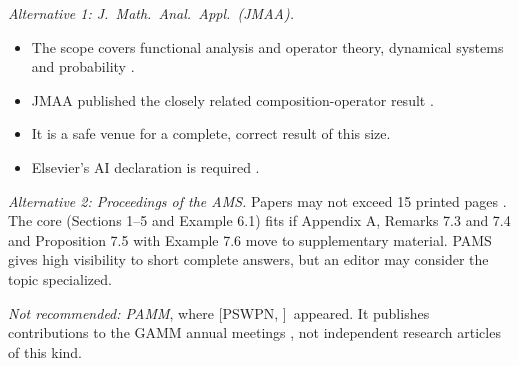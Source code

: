 \documentclass[11pt]{amsart}
\newcommand{\PS}[1][]{[PSWPN\ifx\relax#1\relax\else, #1\fi]}
\begin{document}
\emph{Alternative 1: J.\ Math.\ Anal.\ Appl.\ (JMAA).}
\begin{itemize}
\item The scope covers functional analysis and operator theory, dynamical systems and probability \cite{src-jmaa}.
\item JMAA published the closely related composition-operator result \cite{IIS}.
\item It is a safe venue for a complete, correct result of this size.
\item Elsevier's AI declaration is required \cite{src-elsevier}.
\end{itemize}

\emph{Alternative 2: Proceedings of the AMS.} Papers may not exceed 15 printed pages \cite{src-pams}. The core
(Sections 1--5 and Example 6.1) fits if Appendix A, Remarks 7.3 and 7.4 and Proposition 7.5 with Example 7.6 move to
supplementary material. PAMS gives high visibility to short complete answers, but an editor may consider the topic
specialized.

\emph{Not recommended: PAMM}, where \PS\ appeared. It publishes contributions to the GAMM annual meetings
\cite{src-pswpn}, not independent research articles of this kind.
\end{document}
